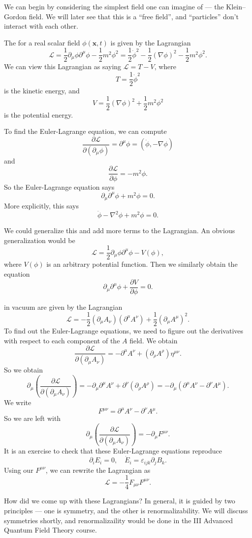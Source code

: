 \documentclass[a4paper]{article}
\begin{document}
We can begin by considering the simplest field one can imagine of --- the Klein--Gordon field. We will later see that this is a ``free field'', and ``particles'' don't interact with each other.

\begin{eg}
  The  for a real scalar field $\phi(\mathbf{x}, t)$ is given by the Lagrangian
  \[
    \mathcal{L} = \frac{1}{2} \partial_\mu \phi \partial^\mu \phi - \frac{1}{2}m^2 \phi^2 = \frac{1}{2} \dot{\phi}^2 - \frac{1}{2} (\nabla \phi)^2 - \frac{1}{2} m^2 \phi^2.
  \]
  We can view this Lagrangian as saying $\mathcal{L} = T - V$, where
  \[
    T = \frac{1}{2} \dot{\phi}^2
  \]
  is the kinetic energy, and
  \[
    V = \frac{1}{2} (\nabla \phi)^2 + \frac{1}{2}m^2 \phi^2
  \]
  is the potential energy.

  To find the Euler-Lagrange equation, we can compute
  \[
    \frac{\partial \mathcal{L}}{\partial(\partial_\mu \phi)} = \partial^\mu \phi = (\dot{\phi}, -\nabla \phi)
  \]
  and
  \[
    \frac{\partial \mathcal{L}}{\partial \phi} = -m^2 \phi.
  \]
  So the Euler-Lagrange equation says
  \[
    \partial_\mu \partial^\mu \phi + m^2 \phi = 0.
  \]
  More explicitly, this says
  \[
    \ddot{\phi} - \nabla^2 \phi + m^2 \phi = 0.
  \]
\end{eg}
We could generalize this and add more terms to the Lagrangian. An obvious generalization would be
\[
  \mathcal{L} = \frac{1}{2} \partial_\mu \phi \partial^\mu \phi - V(\phi),
\]
where $V(\phi)$ is an arbitrary potential function. Then we similarly obtain the equation
\[
  \partial_\mu \partial^\mu \phi + \frac{\partial V}{\partial \phi} = 0.
\]

\begin{eg}
   in vacuum are given by the Lagrangian
  \[
    \mathcal{L} = -\frac{1}{2} (\partial_\mu A_\nu)(\partial^\mu A^\nu) + \frac{1}{2}(\partial_\mu A^\mu)^2.
  \]
  To find out the Euler-Lagrange equations, we need to figure out the derivatives with respect to each component of the $A$ field. We obtain
  \[
    \frac{\partial \mathcal{L}}{\partial(\partial_\mu A_\nu)} = -\partial^\mu A^\nu + (\partial_\rho A^\rho) \eta^{\mu\nu}.
  \]
  So we obtain
  \[
    \partial_\mu \left(\frac{\partial \mathcal{L}}{\partial(\partial_\mu A_\nu)}\right) = - \partial_\mu\partial^\mu A^\nu + \partial^\nu (\partial_\rho A^\rho) = - \partial_\mu (\partial^\mu A^\nu - \partial^\nu A^\mu).
  \]
  We write
  \[
    F^{\mu\nu} = \partial^\mu A^\nu - \partial^\nu A^\mu.
  \]
  So we are left with
  \[
    \partial_\mu \left(\frac{\partial \mathcal{L}}{\partial(\partial_\mu A_\nu)}\right) = -\partial_\mu F^{\mu\nu}.
  \]
  It is an exercise to check that these Euler-Lagrange equations reproduce
  \[
    \partial_i E_i = 0,\quad \dot{E}_i = \varepsilon_{ijk} \partial_j B_k.
  \]
  Using our $F^{\mu\nu}$, we can rewrite the Lagrangian as
  \[
    \mathcal{L} = -\frac{1}{4} F_{\mu\nu}F^{\mu\nu}.
  \]
\end{eg}
How did we come up with these Lagrangians? In general, it is guided by two principles --- one is symmetry, and the other is renormalizability. We will discuss symmetries shortly, and renormalizaility would be done in the III Advanced Quantum Field Theory course.
\end{document}
